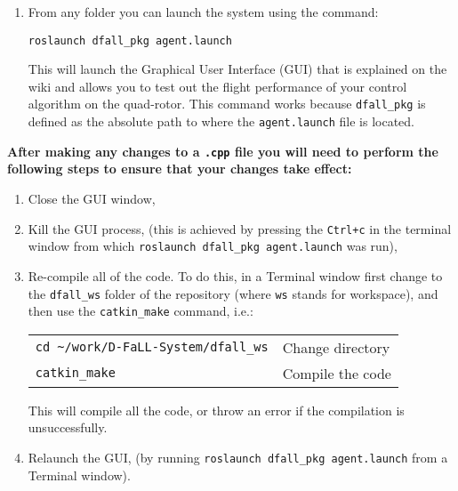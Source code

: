 \documentclass[]{report}
\newcommand{\roslaunchcommand}{roslaunch dfall\_pkg agent.launch}
\newcommand{\rospackagename}{dfall\_pkg}
\newcommand{\launchfilename}{agent.launch}
\newcommand{\catkinmakefullpath}{\textasciitilde/work/D-FaLL-System/dfall\_ws}
\newcommand{\workspacefoldername}{dfall\_ws}
\begin{document}
\begin{enumerate}[topsep=-1pt , itemsep=1pt ,  label = \textbf{(\arabic{*})} ]
		
		\item From any folder you can launch the system using the command:
		
		\begin{center}
			\large{\texttt{\roslaunchcommand}}
		\end{center}
	
		This will launch the Graphical User Interface (GUI) that is explained on the wiki and allows you to test out the flight performance of your control algorithm on the quad-rotor. This command works because \texttt{\rospackagename} is defined as the absolute path to where the \texttt{\launchfilename} file is located.
	\end{enumerate}

	\clearpage

	\begin{center}
		\textbf{After making any changes to a \texttt{.cpp} file you will need to perform the following steps to ensure that your changes take effect:}
	\end{center}
	
	\begin{enumerate}[topsep=-1pt , itemsep=1pt ,  label = \textbf{(\arabic{*})} ]
		\item Close the GUI window,
		\item Kill the GUI process, (this is achieved by pressing the \texttt{Ctrl+c} in the terminal window from which \texttt{\roslaunchcommand} was run),
		\item Re-compile all of the code. To do this, in a Terminal window first change to the \texttt{\workspacefoldername} folder of the repository (where \texttt{ws} stands for workspace), and then use the \texttt{catkin\_make} command, i.e.:
		
		\begin{center}
			\begin{tabular}{ll}
				\large{\texttt{cd \catkinmakefullpath}}
				& Change directory
				\\
				\large{\texttt{catkin\_make}}
				& Compile the code
			\end{tabular}
		\end{center}
		
		This will compile all the code, or throw an error if the compilation is unsuccessfully.
		
		\item Relaunch the GUI, (by running \texttt{\roslaunchcommand} from a Terminal window).
	\end{enumerate}
	
\end{document}
